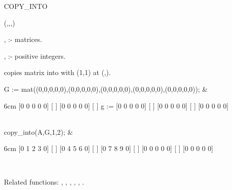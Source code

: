 \begin{Operator}[copyinto]{COPY_INTO}

\begin{Syntax}
(,,,)
\end{Syntax}

, :- matrices. 

, :- positive integers. 


 copies matrix  into  with 
(1,1) at (,).

\begin{Examples} 

G := mat((0,0,0,0,0),(0,0,0,0,0),(0,0,0,0,0),(0,0,0,0,0),(0,0,0,0,0)); &
\begin{multilineoutput}{6cm}
     [0  0  0  0  0]
     [             ]
     [0  0  0  0  0]
     [             ]
g := [0  0  0  0  0]
     [             ]
     [0  0  0  0  0]
     [             ]
     [0  0  0  0  0]
\end{multilineoutput} \\

copy_into(A,G,1,2); &
\begin{multilineoutput}{6cm}
[0  1  2  3  0]
[             ]
[0  4  5  6  0]
[             ]
[0  7  8  9  0]
[             ]
[0  0  0  0  0]
[             ]
[0  0  0  0  0]
\end{multilineoutput} \\

\end{Examples}

Related functions: 
, , , 
, , .

\end{Operator}


